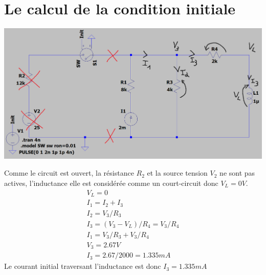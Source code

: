 \documentclass{homeworg}
\begin{document}
\section{Le calcul de la condition initiale}
    \begin{center}
        \includegraphics[scale=0.35]{Iinit.png}
    \end{center}
    Comme le circuit est ouvert, la résistance $R_2$ et la source tension $V_2$ ne sont pas actives, l'inductance elle est considérée comme un court-circuit donc $V_L = 0V$.
    \begin{align}
        V_L = 0\\
        I_1 = I_2 + I_3\\
        I_2 = V_3 / R_3\\
        I_3 = (V_3 - V_L) / R_4 = V_3 / R_4\\
        I_1 = V_3 / R_3 + V_3 / R_4\\
        V_3 = 2.67V\\
        I_3 = 2.67 / 2000 = 1.335mA
    \end{align}
    Le courant initial traversant l'inductance est donc $I_3 = 1.335mA$
\newpage
\end{document}
